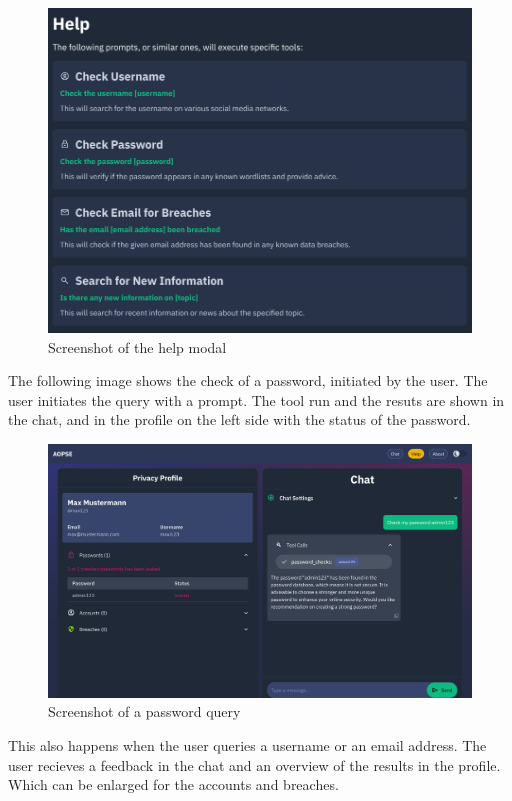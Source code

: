 \documentclass[
    a4paper,
    pagesize,
	pdftex,
    12pt,
]{scrartcl}
\begin{document}
\begin{figure}[H]
	\centering
	\includegraphics[width=13cm]{Frontend-help-modal.png}
	\caption{Screenshot of the help modal}
	\label{fig:frondent-help-modal}
\end{figure}
The following image shows the check of a password, initiated by the user. The user initiates the query with a prompt. The tool run and the resuts are shown in the chat, and in the profile on the left side with the status of the password.
\begin{figure}[H]
	\centering
	\includegraphics[width=15cm]{Frontend-password-check.png}
	\caption{Screenshot of a password query}
	\label{fig:frondent-password-check}
\end{figure}
This also happens when the user queries a username or an email address. The user recieves a feedback in the chat and an overview of the results in the profile. Which can be enlarged for the accounts and breaches.
\end{document}
